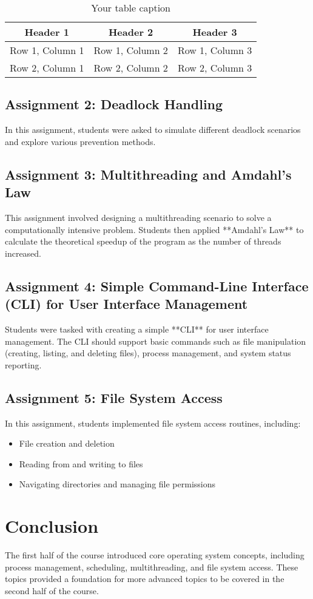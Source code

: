 \documentclass[12pt]{article}
\begin{document}
\begin{table}[htbp] %
    \centering
    \begin{tabular}{|c|c|c|} %
    \hline
    Header 1 & Header 2 & Header 3 \\ %
    \hline
    Row 1, Column 1 & Row 1, Column 2 & Row 1, Column 3 \\ %
    \hline
    Row 2, Column 1 & Row 2, Column 2 & Row 2, Column 3 \\ %
    \hline
    \end{tabular}
    \caption{Your table caption} %
    \label{tab:your_label} %
\end{table}
\subsection{Assignment 2: Deadlock Handling}
In this assignment, students were asked to simulate different deadlock scenarios and explore various prevention methods.

\subsection{Assignment 3: Multithreading and Amdahl's Law}
This assignment involved designing a multithreading scenario to solve a computationally intensive problem. Students then applied **Amdahl's Law** to calculate the theoretical speedup of the program as the number of threads increased.

\subsection{Assignment 4: Simple Command-Line Interface (CLI) for User Interface Management}
Students were tasked with creating a simple **CLI** for user interface management. The CLI should support basic commands such as file manipulation (creating, listing, and deleting files), process management, and system status reporting.

\subsection{Assignment 5: File System Access}
In this assignment, students implemented file system access routines, including:
\begin{itemize}
    \item File creation and deletion
    \item Reading from and writing to files
    \item Navigating directories and managing file permissions
\end{itemize}

\section{Conclusion}
The first half of the course introduced core operating system concepts, including process management, scheduling, multithreading, and file system access. These topics provided a foundation for more advanced topics to be covered in the second half of the course.
\end{document}
